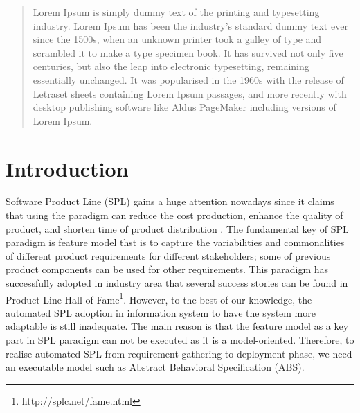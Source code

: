 \documentclass[conference]{IEEEtran}
\begin{document}




\maketitle

\begin{abstract}
Lorem Ipsum is simply dummy text of the printing and typesetting industry. Lorem Ipsum has been the industry's standard dummy text ever since the 1500s, when an unknown printer took a galley of type and scrambled it to make a type specimen book. It has survived not only five centuries, but also the leap into electronic typesetting, remaining essentially unchanged. It was popularised in the 1960s with the release of Letraset sheets containing Lorem Ipsum passages, and more recently with desktop publishing software like Aldus PageMaker including versions of Lorem Ipsum.
\end{abstract}





%
\IEEEpeerreviewmaketitle

\section{Introduction} \label{introduction}
Software Product Line (SPL) gains a huge attention nowadays since it claims that using the paradigm can reduce the cost production, enhance the quality of product, and shorten time of product distribution \cite{pohl:SPLE}. The fundamental key of SPL paradigm is feature model thst is to capture the variabilities and commonalities of different product requirements for different stakeholders; some of previous product components can be used for other requirements. This paradigm has successfully adopted in industry area that several success stories can be found in Product Line Hall of Fame\footnote{http://splc.net/fame.html}. However, to the best of our knowledge, the automated SPL adoption in information system to have the system more adaptable is still inadequate. The main reason is that the feature model as a key part in SPL paradigm can not be executed as it is a model-oriented. Therefore, to realise automated SPL from requirement gathering to deployment phase, we need an executable model such as Abstract Behavioral Specification (ABS).
\end{document}
